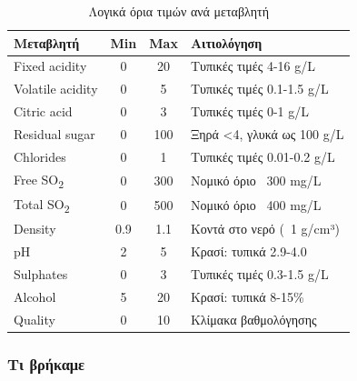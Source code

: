 \documentclass[12pt,a4paper]{article}
\begin{document}
\begin{table}[H]
\centering
\caption{\textgreek{Λογικά όρια τιμών ανά μεταβλητή}}
\label{tab:limits}
\begin{tabular}{@{}lccp{4.5cm}@{}}
\toprule
\textbf{\textgreek{Μεταβλητή}} & \textbf{Min} & \textbf{Max} & \textbf{\textgreek{Αιτιολόγηση}} \\
\midrule
Fixed acidity & 0 & 20 & \textgreek{Τυπικές τιμές 4-16 g/L} \\
Volatile acidity & 0 & 5 & \textgreek{Τυπικές τιμές 0.1-1.5 g/L} \\
Citric acid & 0 & 3 & \textgreek{Τυπικές τιμές 0-1 g/L} \\
Residual sugar & 0 & 100 & \textgreek{Ξηρά <4, γλυκά ως 100 g/L} \\
Chlorides & 0 & 1 & \textgreek{Τυπικές τιμές 0.01-0.2 g/L} \\
Free SO\textsubscript{2} & 0 & 300 & \textgreek{Νομικό όριο ~300 mg/L} \\
Total SO\textsubscript{2} & 0 & 500 & \textgreek{Νομικό όριο ~400 mg/L} \\
Density & 0.9 & 1.1 & \textgreek{Κοντά στο νερό (~1 g/cm³)} \\
pH & 2 & 5 & \textgreek{Κρασί: τυπικά 2.9-4.0} \\
Sulphates & 0 & 3 & \textgreek{Τυπικές τιμές 0.3-1.5 g/L} \\
Alcohol & 5 & 20 & \textgreek{Κρασί: τυπικά 8-15\%} \\
Quality & 0 & 10 & \textgreek{Κλίμακα βαθμολόγησης} \\
\bottomrule
\end{tabular}
\end{table}

\subsubsection{\textgreek{Τι βρήκαμε}}
\end{document}
